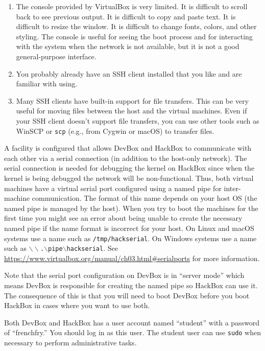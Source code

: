 \documentclass{article}
\newcommand{\filename}[1]{\texttt{#1}}
\begin{document}
\begin{enumerate}
  \item The console provided by VirtualBox is very limited. It is difficult to scroll back to
    see previous output. It is difficult to copy and paste text. It is difficult to resize the
    window. It is difficult to change fonts, colors, and other styling. The console is useful
    for seeing the boot process and for interacting with the system when the network is not
    available, but it is not a good general-purpose interface.

  \item You probably already have an SSH client installed that you like and are familiar with
    using.
    
  \item Many SSH clients have built-in support for file transfers. This can be very useful for
    moving files between the host and the virtual machines. Even if your SSH client doesn't
    support file transfers, you can use other tools such as WinSCP or \texttt{scp} (e.g., from
    Cygwin or macOS) to transfer files.
\end{enumerate}

A facility is configured that allows DevBox and HackBox to communicate with each other via a
serial connection (in addition to the host-only network). The serial connection is needed for
debugging the kernel on HackBox since when the kernel is being debugged the network will be
non-functional. Thus, both virtual machines have a virtual serial port configured using a named
pipe for inter-machine communication. The format of this name depends on your host OS (the named
pipe is managed by the host). When you try to boot the machines for the first time you might see
an error about being unable to create the necessary named pipe if the name format is incorrect
for your host. On Linux and macOS systems use a name such as \filename{/tmp/hackserial}. On
Windows systems use a name such as
\filename{$\backslash\backslash$.$\backslash$pipe$\backslash$hackserial}. See
\url{https://www.virtualbox.org/manual/ch03.html#serialports} for more information.

Note that the serial port configuration on DevBox is in ``server mode'' which means DevBox is
responsible for creating the named pipe so HackBox can use it. The consequence of this is that
you will need to boot DevBox before you boot HackBox in cases where you want to use both.

Both DevBox and HackBox has a user account named ``student'' with a password of ``frenchfry.''
You should log in as this user. The student user can use \texttt{sudo} when necessary to perform
administrative tasks.
\end{document}
